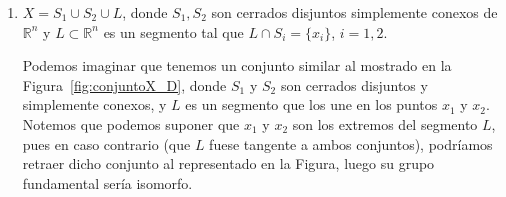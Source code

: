 \begin{ejercicio}
\begin{enumerate}[label=\alph*)]
\begin{description}
                Por tanto, por el Teorema de Seifert-Van Kampen, tenemos que:
                \begin{equation*}
                    \pi_1(X) \cong \{1\}
                \end{equation*}

                Como $X$ es unión de dos conjuntos arcoconexos con intersección no vacía, tenemos que $X$ es arcoconexo, por lo que $X$ es simplemente conexo.
            \end{description}

        \item \label{item:cerrados_disjuntos}
        $X = S_1 \cup S_2 \cup L$, donde $S_1,S_2$ son cerrados disjuntos simplemente conexos de $\mathbb{R}^n$ y $L\subset \mathbb{R}^n$ es un segmento tal que $L\cap S_i =\{x_i\}$, $i = 1,2$.

            Podemos imaginar que tenemos un conjunto similar al mostrado en la Figura~\ref{fig:conjuntoX_D}, donde $S_1$ y $S_2$ son cerrados disjuntos y simplemente conexos, y $L$ es un segmento que los une en los puntos $x_1$ y $x_2$. Notemos que podemos suponer que $x_1$ y $x_2$ son los extremos del segmento $L$, pues en caso contrario (que $L$ fuese tangente a ambos conjuntos), podríamos retraer dicho conjunto al representado en la Figura, luego su grupo fundamental sería isomorfo.
            \begin{figure}[ht]
                \centering
\end{figure}
\end{enumerate}
\end{ejercicio}
